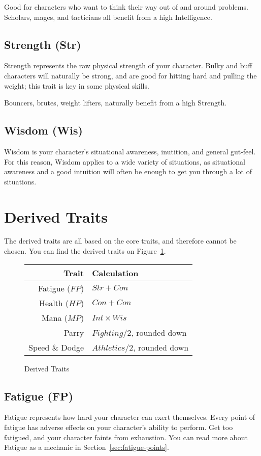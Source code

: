 Good for characters who want to think their way out of and around problems.
Scholars, mages, and tacticians all benefit from a high Intelligence.

\subsection{Strength (Str)}
Strength represents the raw physical strength of your character.
Bulky and buff characters will naturally be strong, and are good for hitting hard and pulling the weight; this trait is key in some physical skills.

Bouncers, brutes, weight lifters, naturally benefit from a high Strength.

\subsection{Wisdom (Wis)}
Wisdom is your character's situational awareness, inutition, and general gut-feel.
For this reason, Wisdom applies to a wide variety of situations, as situational awareness and a good intuition will often be enough to get you through a lot of situations.

\section{Derived Traits}
The derived traits are all based on the core traits, and therefore cannot be chosen. You can find the derived traits on Figure~\ref{fig:derived_traits}.

\begin{figure}[!ht]
    \centering
\begin{tabular}{r | l}
    \textbf{Trait} & \textbf{Calculation} \\\hline
    Fatigue ($FP$) & $Str+Con$ \\
    Health  ($HP$) & $Con+Con$ \\
    Mana    ($MP$) & $Int\times Wis$ \\
    Parry          & $Fighting/2$, rounded down\\
    Speed \& Dodge & $Athletics / 2$, rounded down\\
\end{tabular}
    \caption{Derived Traits}
    \label{fig:derived_traits}
\end{figure}

\subsection{Fatigue (FP)}
Fatigue represents how hard your character can exert themselves.
Every point of fatigue has adverse effects on your character's ability to perform.
Get too fatigued, and your character faints from exhaustion.
You can read more about Fatigue as a mechanic in Section~\ref{sec:fatigue-points}.

